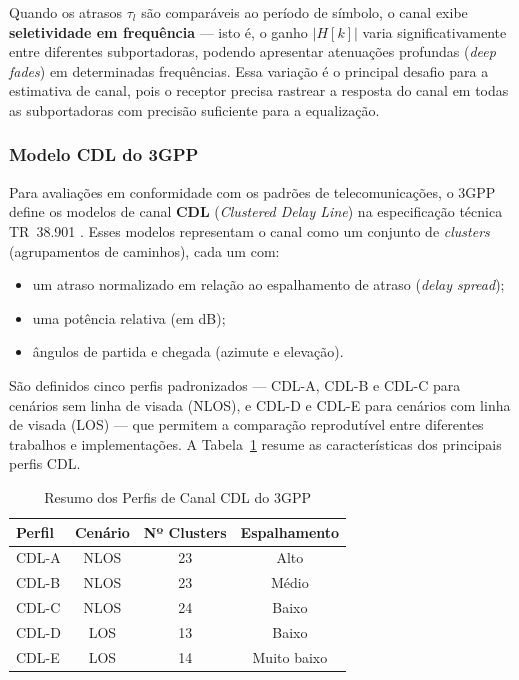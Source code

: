 \documentclass[conference]{IEEEtran}
\begin{document}
Quando os atrasos $\tau_l$ são comparáveis ao período de símbolo, o canal exibe \textbf{seletividade em frequência} --- isto é, o ganho $|H[k]|$ varia significativamente entre diferentes subportadoras, podendo apresentar atenuações profundas (\textit{deep fades}) em determinadas frequências. Essa variação é o principal desafio para a estimativa de canal, pois o receptor precisa rastrear a resposta do canal em todas as subportadoras com precisão suficiente para a equalização.

\subsubsection{Modelo CDL do 3GPP}

Para avaliações em conformidade com os padrões de telecomunicações, o 3GPP define os modelos de canal \textbf{CDL} (\textit{Clustered Delay Line}) na especificação técnica TR~38.901 \cite{3gpp38901}. Esses modelos representam o canal como um conjunto de \textit{clusters} (agrupamentos de caminhos), cada um com:
\begin{itemize}
    \item um atraso normalizado em relação ao espalhamento de atraso (\textit{delay spread});
    \item uma potência relativa (em dB);
    \item ângulos de partida e chegada (azimute e elevação).
\end{itemize}

São definidos cinco perfis padronizados --- CDL-A, CDL-B e CDL-C para cenários sem linha de visada (NLOS), e CDL-D e CDL-E para cenários com linha de visada (LOS) --- que permitem a comparação reprodutível entre diferentes trabalhos e implementações. A Tabela~\ref{tab:cdl_profiles} resume as características dos principais perfis CDL.

\begin{table}[htbp]
\centering
\caption{Resumo dos Perfis de Canal CDL do 3GPP \cite{3gpp38901}}
\label{tab:cdl_profiles}
\begin{tabular}{@{}lccc@{}}
\toprule
\textbf{Perfil} & \textbf{Cenário} & \textbf{Nº Clusters} & \textbf{Espalhamento} \\
\midrule
CDL-A & NLOS & 23 & Alto \\
CDL-B & NLOS & 23 & Médio \\
CDL-C & NLOS & 24 & Baixo \\
CDL-D & LOS & 13 & Baixo \\
CDL-E & LOS & 14 & Muito baixo \\
\bottomrule
\end{tabular}
\end{table}
\end{document}
